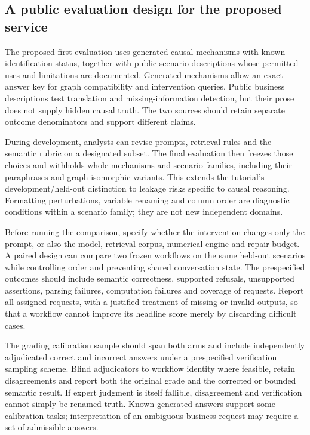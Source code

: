 \subsection{A public evaluation design for the proposed service}
\label{exec20:validity-design}

The proposed first evaluation uses generated causal mechanisms with known
identification status, together with public scenario descriptions whose
permitted uses and limitations are documented. Generated mechanisms allow an
exact answer key for graph compatibility and intervention queries. Public
business descriptions test translation and missing-information detection, but
their prose does not supply hidden causal truth. The two sources should retain
separate outcome denominators and support different claims.

During development, analysts can revise prompts, retrieval rules and the
semantic rubric on a designated subset. The final evaluation then freezes those
choices and withholds whole mechanisms and scenario families, including their
paraphrases and graph-isomorphic variants. This extends the tutorial's
development/held-out distinction to leakage risks specific to causal reasoning.
Formatting perturbations, variable renaming and column order are diagnostic
conditions within a scenario family; they are not new independent domains.
\citep{exec20_validity}

Before running the comparison, specify whether the intervention changes only
the prompt, or also the model, retrieval corpus, numerical engine and repair
budget. A paired design can compare two frozen workflows on the same held-out
scenarios while controlling order and preventing shared conversation state.
The prespecified outcomes should include semantic correctness, supported
refusals, unsupported assertions, parsing failures, computation failures and
coverage of requests. Report all assigned requests, with a justified treatment
of missing or invalid outputs, so that a workflow cannot improve its headline
score merely by discarding difficult cases.

The grading calibration sample should span both arms and include independently
adjudicated correct and incorrect answers under a prespecified verification
sampling scheme. Blind adjudicators to workflow identity where feasible, retain
disagreements and report both the original grade and the corrected or bounded
semantic result. If expert judgment is itself fallible, disagreement and
verification cannot simply be renamed truth. Known generated answers support
some calibration tasks; interpretation of an ambiguous business request may
require a set of admissible answers.

